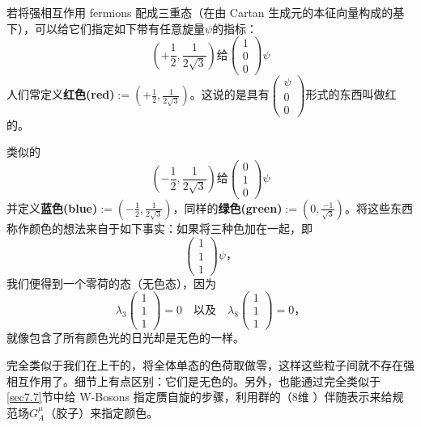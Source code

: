 若将强相互作用 fermions 配成三重态（在由 Cartan 生成元的本征向量构成的基下），可以给它们指定如下带有任意旋量$\psi$的指标：
\[
\left(+\frac{1}{2},\frac{1}{2\sqrt{3}}\right) \text{给} \begin{pmatrix}
1 \\ 0 \\ 0
\end{pmatrix}\psi
\]
人们常定义{\bfseries 红色(red)}$:=\left(+\frac{1}{2},\frac{1}{2\sqrt{3}}\right)$。这说的是具有$\begin{pmatrix}
\psi \\ 0 \\ 0
\end{pmatrix}$形式的东西叫做红的。

类似的
\[
\left(-\frac{1}{2},\frac{1}{2\sqrt{3}}\right) \text{给} \begin{pmatrix}
0 \\ 1 \\ 0
\end{pmatrix}\psi
\]
并定义{\bfseries 蓝色(blue)}$:=\left(-\frac{1}{2},\frac{1}{2\sqrt{3}}\right)$，同样的{\bfseries 绿色(green)}$:=\left(0,\frac{-1}{\sqrt{3}}\right)$。将这些东西称作颜色的想法来自于如下事实：如果将三种色加在一起，即
\[
\begin{pmatrix}
1 \\ 1 \\ 1
\end{pmatrix}\psi\text{，}
\]
我们便得到一个零荷的态（无色态），因为
\[
\lambda_3\begin{pmatrix}
1 \\ 1 \\ 1
\end{pmatrix}=0 \quad \text{以及} \quad \lambda_8\begin{pmatrix}
1 \\ 1 \\ 1
\end{pmatrix}=0\text{，}
\]
就像包含了所有颜色光的日光却是无色的一样。

完全类似于我们在\sutw 上干的，将全体\suth 单态的色荷取做零，这样这些粒子间就不存在强相互作用了。细节上有点区别：它们是无色的。另外，也能通过完全类似于\ref{sec7.7}节中给 W-Bosons 指定赝自旋的步骤，利用\suth 群的（$8$维%
%
）伴随表示来给规范场$G_A^\mu$（胶子）来指定颜色。
